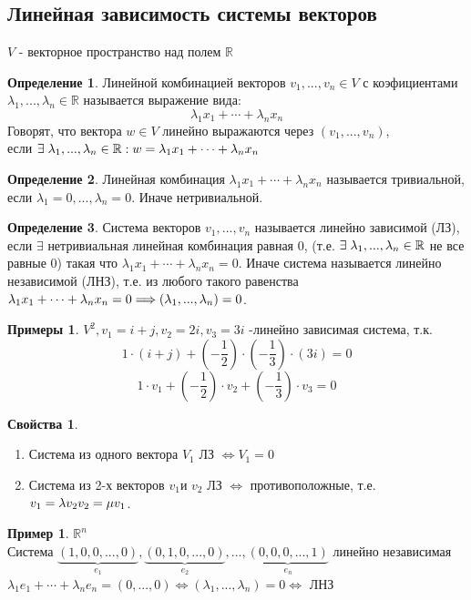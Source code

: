 \documentclass[a4paper, 12pt]{article}
\newcommand{\R}{\mathbb R}
\newcommand\tab[1][.5cm]{\hspace*{#1}}
\theoremstyle{definition}
\newtheorem*{definition}{Определение}
\newtheorem*{example}{Примеры}
\newtheorem*{example1}{Пример}
\newtheorem*{properties}{Свойства}
\begin{document}
  \subsection{Линейная зависимость системы векторов}
  $V$ - векторное пространство над полем $\R$
  \begin{definition}
    Линейной комбинацией векторов $v_1,...,v_n \in V$ с коэфициентами $\lambda_1,...,\lambda_n \in \R$ называется выражение вида: 
    $$\lambda_1 x_1 + \cdots + \lambda_n x_n$$ 
    Говорят, что вектора $w \in V$ линейно выражаются через $(v_1,...,v_n)$, \\ если $\exists\tab[0.1cm]\lambda_1,...,\lambda_n \in \R: w = \lambda_1 x_1 + \cdots + \lambda_n x_n$   
  \end{definition}   
  \begin{definition}
    Линейная комбинация $\lambda_1 x_1 + \cdots + \lambda_n x_n$ называется тривиальной, если $\lambda_1 = 0,...,\lambda_n = 0$. Иначе нетривиальной.
  \end{definition}
  \begin{definition}
    Система векторов $v_1,...,v_n$ называется линейно зависимой (ЛЗ), если $\exists$ нетривиальная линейная комбинация равная 0, (т.е. $\exists \tab[0.1cm]\lambda_1,...,\lambda_n \in \R$ не все равные 0) такая что $\lambda_1 x_1 + \cdots + \lambda_n x_n = 0$. Иначе система называется линейно независимой (ЛНЗ), т.е. из любого такого равенства $\lambda_1 x_1 + \cdots + \lambda_n x_n = 0 \\ \Longrightarrow (\lambda_1,...,\lambda_n) = 0$.
  \end{definition}
  \begin{example}
    $V^2, v_1 = i + j, v_2 = 2i, v_3 = 3i$ -линейно зависимая система, т.к. $$1 \cdot (i + j) + (- \frac{1}{2}) \cdot (-\frac{1}{3}) \cdot (3i) = 0$$ $$1 \cdot v_1 + (-\frac{1}{2}) \cdot v_2 + (-\frac{1}{3}) \cdot v_3 = 0$$  
  \end{example}  
  \begin{properties} \end{properties} 
    \begin{enumerate}
      \item Система из одного вектора $V_1$ ЛЗ $\Longleftrightarrow V_1 = 0$  
      \item Система из 2-х векторов $v_1 \text{и } v_2$ ЛЗ $\Longleftrightarrow$ противоположные, т.е. $v_1 = \lambda v_2 \\ v_2 = \mu v_1$. 
    \end{enumerate}
  \begin{example1}
    $\R^n$ \\
    Система $\underbrace{(1,0,0,...,0)}_{e_1} , \underbrace{(0,1,0,...,0)}_{e_2},...,\underbrace{(0,0,0,...,1)}_{e_n}$ линейно независимая \\
    $\lambda_1 e_1 + \cdots + \lambda_n e_n = (0,...,0) \Longleftrightarrow (\lambda_1,...,\lambda_n) = 0 \Longleftrightarrow $ ЛНЗ 
  \end{example1}
\end{document}
